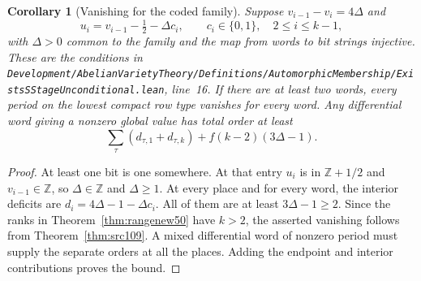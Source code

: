 \documentclass[a4paper,11pt]{article}
\newtheorem{corollary}[proposition]{Corollary}
\theoremstyle{definition}
\theoremstyle{remark}
\newcommand{\ZZ}{\mathbb Z}\newcommand{\ord}{\operatorname{ord}}
\newcommand{\srcloc}[2]{{\small\nolinkurl{#1.lean}}, line~#2}
\numberwithin{equation}{section}
\begin{document}
\begin{corollary}[Vanishing for the coded family]\label{cor:code109}
Suppose \(v_{i-1}-v_i=4\Delta\) and
\[
       u_i=v_{i-1}-\tfrac12-\Delta c_i,\qquad
       c_i\in\{0,1\},\quad 2\le i\le k-1 ,
\]
with \(\Delta>0\) common to the family and the map from words to
bit strings injective. These are the conditions in
\srcloc{Development/AbelianVarietyTheory/Definitions/AutomorphicMembership/ExistsSStageUnconditional}{16}.
If there are at least two words, every period on the lowest
compact row type vanishes for every word. Any differential word
giving a nonzero global value has total order at least
\[
       \sum_\tau (d_{\tau,1}+d_{\tau,k})
                       + f(k-2)(3\Delta-1).
\]
\end{corollary}
\begin{proof}
At least one bit is one somewhere. At that entry \(u_i\) is
in \(\ZZ+1/2\) and \(v_{i-1}\in\ZZ\), so \(\Delta\in\ZZ\)
and \(\Delta\ge1\). At every place and for every word, the
interior deficits are \(d_i=4\Delta-1-\Delta c_i\).
All of them are at least \(3\Delta-1\ge2\). Since the ranks
in Theorem~\ref{thm:rangenew50} have \(k>2\), the asserted
vanishing follows from Theorem~\ref{thm:src109}. A mixed
differential word of nonzero period must supply the separate
orders at all the places. Adding the endpoint and interior
contributions proves the bound.
\end{proof}
\end{document}
